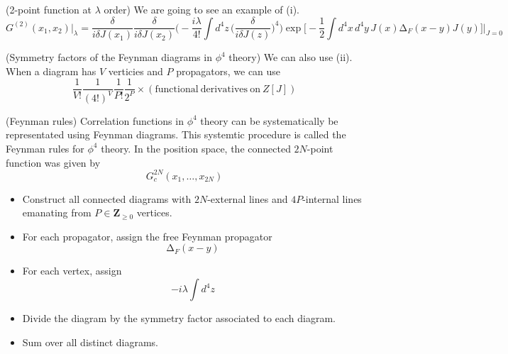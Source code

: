 \vspace{2ex}
\begin{ex}
(2-point function at $\lambda $ order) We are going to see an example of (i).
\[G^{(2)}(x_1,x_2)\Big|_{\lambda }=\dfrac{\delta }{i\delta J(x_1)}\dfrac{\delta }{i\delta J(x_2)}\Big(-\dfrac{i\lambda }{4!}\int d^{4}z\,\Big(\dfrac{\delta }{i\delta J(z)}\Big)^{4}\Big)\exp \Big[-\dfrac{1}{2}\int d^{4}x\,d^{4}y\,J(x)\mathrm{\Delta }_{F}(x-y)J(y)\Big]\Big|_{J=0}\]
\end{ex}
\vspace{2ex}
\begin{ex}
(Symmetry factors of the Feynman diagrams in $\phi ^{4}$ theory) 
We can also use (ii). When a diagram has $V$ verticies and $P$ propagators, we can use
\[\dfrac{1}{V!}\dfrac{1}{(4!)^{V}}\dfrac{1}{P!}\dfrac{1}{2^{P}}\times (\mathrm{functional\ derivatives\ on\ }Z[J])\]
\end{ex}
\vspace{2ex}
\begin{defi}
(Feynman rules) Correlation functions in $\phi ^{4}$ theory can be systematically be representated using Feynman diagrams. This systemtic procedure is called the Feynman rules for $\phi ^{4}$ theory. In the position space, the connected $2N$-point function was given by
\[G_{c}^{2N}(x_1,\ldots ,x_{2N})\]
\begin{itemize}
\item[(I)] Construct all connected diagrams with $2N$-external lines and $4P$-internal lines emanating from $P\in {\bm Z}_{\geq 0}$ vertices.
\item[(II)] For each propagator, assign the free Feynman propagator
\[\mathrm{\Delta }_{F}(x-y)\]

\item[(III)] For each vertex, assign 
\[-i\lambda \int d^{4}z\]
\item[(IV)] Divide the diagram by the symmetry factor associated to each diagram.
\item[(V)] Sum over all distinct diagrams.
\end{itemize} 
\end{defi}
\vspace{2ex}

